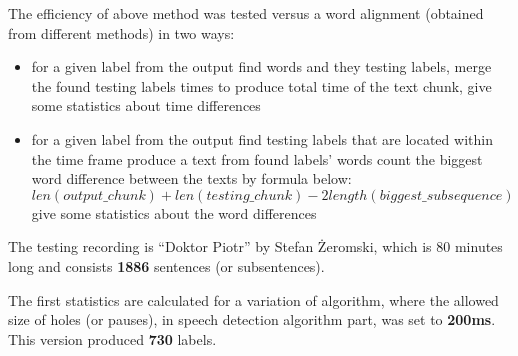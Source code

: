 \documentclass[12pt,a4paper,english]{article}
\begin{document}
The efficiency of above method was tested versus a word alignment (obtained from different methods) in two ways:
\begin{itemize}
    \item for a given label from the output find words and they testing labels, \newline
          merge the found testing labels times to produce total time of the text chunk, \newline
          give some statistics about time differences
    \item for a given label from the output find testing labels that are located within the time frame \newline
          produce a text from found labels' words \newline
          count the biggest word difference between the texts by formula below:
          \begin{equation}
               len(output\_chunk) + len(testing\_chunk) - 2 length(biggest\_subsequence)
          \end{equation}
          give some statistics about the word differences
\end{itemize}
The testing recording is “Doktor Piotr” by Stefan Żeromski, which is 80 minutes long and consists \textbf{1886} sentences (or subsentences). \newline

\newpage

The first statistics are calculated for a variation of algorithm, where the allowed size of holes (or pauses), in speech detection algorithm part,
was set to \textbf{200ms}. This version produced \textbf{730} labels. \newline
\end{document}
